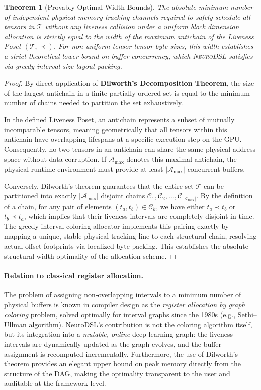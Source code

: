 \documentclass{article}
\newtheorem{theorem}{Theorem}
\begin{document}
\begin{theorem}[Provably Optimal Width Bounds]
The absolute minimum number of independent physical memory tracking channels required to safely schedule all tensors in $\mathcal{T}$ without any liveness collision under a uniform block dimension allocation is strictly equal to the width of the maximum antichain of the Liveness Poset $(\mathcal{T}, \prec)$. For non-uniform tensor tensor byte-sizes, this width establishes a strict theoretical lower bound on buffer concurrency, which \textsc{NeuroDSL} satisfies via greedy interval-size layout packing.
\end{theorem}

\begin{proof}
By direct application of \textbf{Dilworth's Decomposition Theorem}, the size of the largest antichain in a finite partially ordered set is equal to the minimum number of chains needed to partition the set exhaustively.

In the defined Liveness Poset, an antichain represents a subset of mutually incomparable tensors, meaning geometrically that all tensors within this antichain have overlapping lifespans at a specific execution step on the GPU. Consequently, no two tensors in an antichain can share the same physical address space without data corruption. If $\mathcal{A}_{\text{max}}$ denotes this maximal antichain, the physical runtime environment must provide at least $|\mathcal{A}_{\text{max}}|$ concurrent buffers.

Conversely, Dilworth's theorem guarantees that the entire set $\mathcal{T}$ can be partitioned into exactly $|\mathcal{A}_{\text{max}}|$ disjoint chains $\mathcal{C}_1, \mathcal{C}_2, \dots, \mathcal{C}_{|\mathcal{A}_{\text{max}}|}$. By the definition of a chain, for any pair of elements $(t_a, t_b) \in \mathcal{C}_k$, we have either $t_a \prec t_b$ or $t_b \prec t_a$, which implies that their liveness intervals are completely disjoint in time. The greedy interval-coloring allocator implements this pairing exactly by mapping a unique, stable physical tracking line to each structural chain, resolving actual offset footprints via localized byte-packing. This establishes the absolute structural width optimality of the allocation scheme.
\end{proof}

\paragraph{Relation to classical register allocation.}
The problem of assigning non‑overlapping intervals to a minimum number of physical buffers is known in compiler design as the \emph{register allocation by graph coloring} problem, solved optimally for interval graphs since the 1980s (e.g., Sethi–Ullman algorithm). NeuroDSL’s contribution is not the coloring algorithm itself, but its integration into a \emph{mutable, online} deep learning graph: the liveness intervals are dynamically updated as the graph evolves, and the buffer assignment is recomputed incrementally. Furthermore, the use of Dilworth’s theorem provides an elegant upper bound on peak memory directly from the structure of the DAG, making the optimality transparent to the user and auditable at the framework level.
\end{document}
